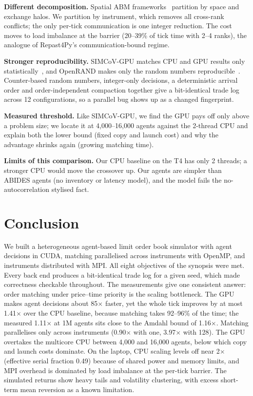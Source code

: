 \textbf{Different decomposition.} Spatial ABM frameworks~\cite{richmond2023,collier2022,leyba2024}
partition by space and exchange halos. We partition by instrument, which removes all cross-rank
conflicts; the only per-tick communication is one integer reduction. The cost moves to load
imbalance at the barrier (20--39\% of tick time with 2--4 ranks), the analogue of Repast4Py's
communication-bound regime.

\textbf{Stronger reproducibility.} SIMCoV-GPU matches CPU and GPU results only
statistically~\cite{leyba2024}, and OpenRAND makes only the random numbers
reproducible~\cite{khan2024}. Counter-based random numbers, integer-only decisions, a deterministic
arrival order and order-independent compaction together give a bit-identical trade log across 12
configurations, so a parallel bug shows up as a changed fingerprint.

\textbf{Measured threshold.} Like SIMCoV-GPU, we find the GPU pays off only above a problem size;
we locate it at 4{,}000--16{,}000 agents against the 2-thread CPU and explain both the lower bound
(fixed copy and launch cost) and why the advantage shrinks again (growing matching time).

\textbf{Limits of this comparison.} Our CPU baseline on the T4 has only 2 threads; a stronger CPU
would move the crossover up. Our agents are simpler than ABIDES agents (no inventory or latency
model), and the model fails the no-autocorrelation stylised fact.

\section{Conclusion}\label{sec:concl}
We built a heterogeneous agent-based limit order book simulator with agent decisions in CUDA,
matching parallelised across instruments with OpenMP, and instruments distributed with MPI. All
eight objectives of the synopsis were met. Every back end produces a bit-identical trade log for a
given seed, which made correctness checkable throughout. The measurements give one consistent
answer: order matching under price--time priority is the scaling bottleneck. The GPU makes agent
decisions about 85$\times$ faster, yet the whole tick improves by at most 1.41$\times$ over the
CPU baseline, because matching takes 92--96\% of the time; the measured 1.11$\times$ at 1M agents
sits close to the Amdahl bound of 1.16$\times$. Matching parallelises only across instruments
(0.90$\times$ with one, 3.97$\times$ with 128). The GPU overtakes the multicore CPU between 4{,}000
and 16{,}000 agents, below which copy and launch costs dominate. On the laptop, CPU scaling levels
off near 2$\times$ (effective serial fraction 0.49) because of shared power and memory limits, and
MPI overhead is dominated by load imbalance at the per-tick barrier. The simulated returns show
heavy tails and volatility clustering, with excess short-term mean reversion as a known limitation.

